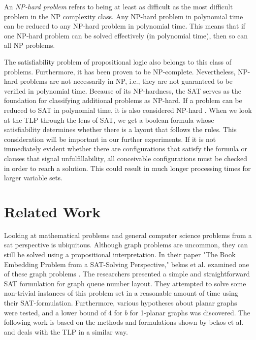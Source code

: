\documentclass[bachelor, english]{algothesis}
\begin{document}
\begin{definition}
    An \emph{NP-hard problem} refers to being at least as difficult as the most difficult problem in the NP complexity class. Any NP-hard problem in polynomial time can be reduced to any NP-hard problem in polynomial time. This means that if one NP-hard problem can be solved effectively (in polynomial time), then so can all NP problems.
\end{definition}
\noindent
The satisfiability problem of propositional logic also belongs to this class of problems. Furthermore, it has been proven to be NP-complete. Nevertheless, NP-hard problems are not necessarily in NP, i.e., they are not guaranteed to be verified in polynomial time. Because of its NP-hardness, the SAT serves as the foundation for classifying additional problems as NP-hard. If a problem can be reduced to SAT in polynomial time, it is also considered NP-hard \cite{SAT_Complexity}. When we look at the TLP through the lens of SAT, we get a boolean formula whose satisfiability determines whether there is a layout that follows the rules. This consideration will be important in our further experiments. If it is not immediately evident whether there are configurations that satisfy the formula or clauses that signal unfulfillability, all conceivable configurations must be checked in order to reach a solution. This could result in much longer processing times for larger variable sets.

\section{Related Work}
Looking at mathematical problems and general computer science problems from a sat perspective is ubiquitous. Although graph problems are uncommon, they can still be solved using a propositional interpretation. In their paper "The Book Embedding Problem from a SAT-Solving Perspective," bekos et al. examined one of these graph problems \cite{book_embedding_sat}. The researchers presented a simple and straightforward SAT formulation for graph queue number layout. They attempted to solve some non-trivial instances of this problem set in a reasonable amount of time using their SAT-formulation. Furthermore, various hypotheses about planar graphs were tested, and a lower bound of 4 for $b$ for 1-planar graphs was discovered. The following work is based on the methods and formulations shown by bekos et al. and deals with the TLP in a similar way.
\end{document}
